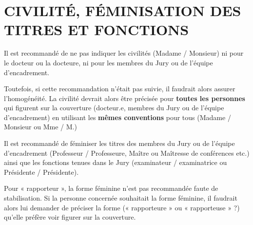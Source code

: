 \documentclass[main=french,a4paper]{book}
\begin{document}
\chapter{CIVILITÉ, FÉMINISATION DES TITRES ET FONCTIONS}
Il est recommandé de ne pas indiquer les civilités (Madame / Monsieur) ni pour le docteur ou la docteure, ni pour les membres du Jury ou de l’équipe d’encadrement.\\ \par 
Toutefois, si cette recommandation n’était pas suivie, il faudrait alors assurer l’homogénéité. La civilité devrait alors être précisée pour \textbf{toutes les personnes} qui figurent sur la couverture (docteur.e, membres du Jury ou de l’équipe d’encadrement) en utilisant les \textbf{mêmes conventions} pour tous (Madame / Monsieur ou Mme / M.)\\ \par
Il est recommandé de féminiser les titres des membres du Jury ou de l’équipe d’encadrement (Professeur / Professeure, Maître ou Maîtresse de conférences etc.) ainsi que les fonctions tenues dans le Jury (examinateur / examinatrice ou Présidente / Présidente). \\ \par
Pour « rapporteur », la forme féminine n’est pas recommandée faute de stabilisation. Si la personne concernée souhaitait la forme féminine, il faudrait alors lui demander de préciser la forme (« rapporteure » ou « rapporteuse » ?) qu’elle préfère voir figurer sur la couverture.
\end{document}
